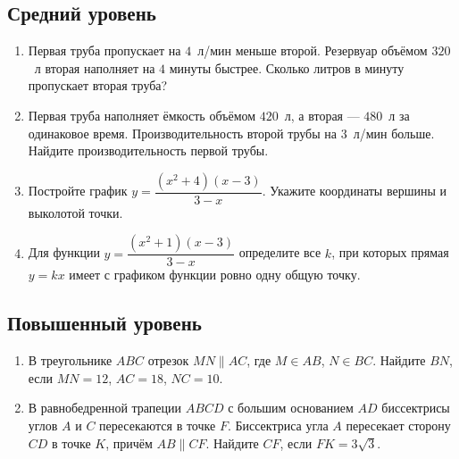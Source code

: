 \documentclass[a4paper,11pt]{article}
\begin{document}
\subsection*{Средний уровень}
\begin{enumerate}[start=5]
\item Первая труба пропускает на \(4\)~л/мин меньше второй. Резервуар объёмом \(320\)~л вторая наполняет на \(4\) минуты быстрее. Сколько литров в минуту пропускает вторая труба?
\item Первая труба наполняет ёмкость объёмом \(420\)~л, а вторая --- \(480\)~л за одинаковое время. Производительность второй трубы на \(3\)~л/мин больше. Найдите производительность первой трубы.
\item Постройте график \(y=\dfrac{(x^2+4)(x-3)}{3-x}\). Укажите координаты вершины и выколотой точки.
\item Для функции \(y=\dfrac{(x^2+1)(x-3)}{3-x}\) определите все \(k\), при которых прямая \(y=kx\) имеет с графиком функции ровно одну общую точку.
\end{enumerate}
\subsection*{Повышенный уровень}
\begin{enumerate}[start=9]
\item В треугольнике \(ABC\) отрезок \(MN\parallel AC\), где \(M\in AB\), \(N\in BC\). Найдите \(BN\), если \(MN=12\), \(AC=18\), \(NC=10\).
\item В равнобедренной трапеции \(ABCD\) с большим основанием \(AD\) биссектрисы углов \(A\) и \(C\) пересекаются в точке \(F\). Биссектриса угла \(A\) пересекает сторону \(CD\) в точке \(K\), причём \(AB\parallel CF\). Найдите \(CF\), если \(FK=3\sqrt3\).
\end{enumerate}
\end{document}
